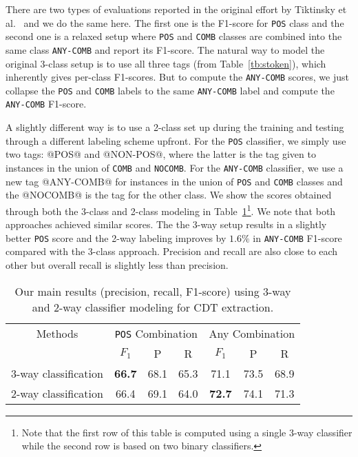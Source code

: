 \documentclass[conference]{IEEEtran}
\begin{document}
There are two types of evaluations reported in the original effort by Tiktinsky et al.~\cite{tiktinsky-etal-2022-dataset} and we do the same here. The first one is the F1-score for \texttt{POS} class and the second one is a relaxed setup where \texttt{POS} and \texttt{COMB} classes are combined into the same class \texttt{ANY-COMB} and report its F1-score. The natural way to model the original 3-class setup is to use all three tags (from Table~\ref{tb:stoken}), which inherently gives per-class F1-scores. But to compute the \texttt{ANY-COMB} scores, we just collapse the \texttt{POS} and \texttt{COMB} labels to the same \texttt{ANY-COMB} label and compute the \texttt{ANY-COMB} F1-score. 

A slightly different way is to use a 2-class set up during the training and testing through a different labeling scheme upfront. For the  \texttt{POS} classifier, we simply use two tags: @POS@ and @NON-POS@, where the latter is the tag given to instances in the union of \texttt{COMB} and \texttt{NOCOMB}. For the \texttt{ANY-COMB} classifier, we use a new tag @ANY-COMB@ for instances in the union of \texttt{POS} and \texttt{COMB} classes and the @NOCOMB@ is the tag for the other class. 
We show the scores obtained through both the 3-class and 2-class modeling in Table~\ref{2-way}\footnote{Note that the first row of this table is computed using a single 3-way classifier while the second row is based on two binary classifiers.}. We note that both approaches achieved similar scores. The the 3-way setup results in a slightly better \texttt{POS} score and the 2-way labeling improves by $1.6\%$ in \texttt{ANY-COMB} F1-score compared with the 3-class approach.  Precision and recall are also close to each other but overall recall is slightly less than precision.


\begin{table}[h]
\centering
\renewcommand{\arraystretch}{1.4}
\caption{Our main results (precision, recall, F1-score) using 3-way and 2-way classifier modeling for CDT extraction.}
\label{2-way}
\begin{tabular}{lcccccc}
\toprule
\multicolumn{1}{c}{Methods} & \multicolumn{3}{c}{\texttt{POS} Combination} & \multicolumn{3}{c}{Any Combination} \\
 & $F_1$ & P & R & $F_1$ & P & R\\\midrule
3-way classification  & \textbf{66.7} & 68.1 & 65.3 & 71.1 & 73.5 & 68.9 \\
2-way classification & 66.4 & 69.1 & 64.0 & \textbf{72.7} & 74.1 & 71.3  \\
\bottomrule
\end{tabular}


\end{table}
\end{document}
